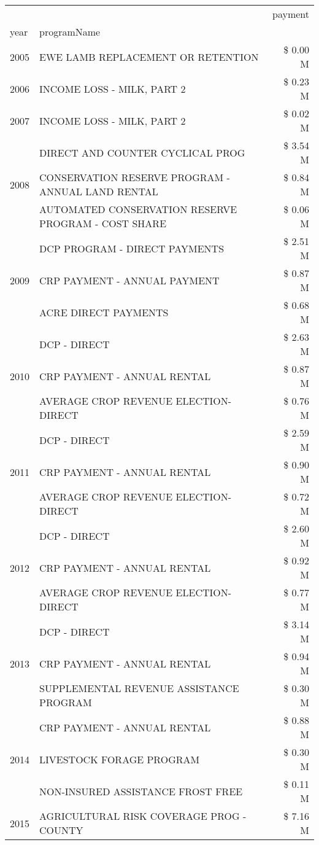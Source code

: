 \begin{tabular}{llr}
\toprule
 &  & payment \\
year & programName &  \\
\midrule
2005 & EWE LAMB REPLACEMENT OR RETENTION & \$ 0.00 M \\
\cline{1-3}
2006 & INCOME LOSS - MILK, PART 2 & \$ 0.23 M \\
\cline{1-3}
2007 & INCOME LOSS - MILK, PART 2 & \$ 0.02 M \\
\cline{1-3}
\multirow[t]{3}{*}{2008} & DIRECT AND COUNTER CYCLICAL PROG & \$ 3.54 M \\
 & CONSERVATION RESERVE PROGRAM - ANNUAL LAND RENTAL & \$ 0.84 M \\
 & AUTOMATED CONSERVATION RESERVE PROGRAM - COST SHARE & \$ 0.06 M \\
\cline{1-3}
\multirow[t]{3}{*}{2009} & DCP PROGRAM - DIRECT PAYMENTS & \$ 2.51 M \\
 & CRP PAYMENT - ANNUAL PAYMENT & \$ 0.87 M \\
 & ACRE DIRECT PAYMENTS & \$ 0.68 M \\
\cline{1-3}
\multirow[t]{3}{*}{2010} & DCP - DIRECT & \$ 2.63 M \\
 & CRP PAYMENT - ANNUAL RENTAL & \$ 0.87 M \\
 & AVERAGE CROP REVENUE ELECTION-DIRECT & \$ 0.76 M \\
\cline{1-3}
\multirow[t]{3}{*}{2011} & DCP - DIRECT & \$ 2.59 M \\
 & CRP PAYMENT - ANNUAL RENTAL & \$ 0.90 M \\
 & AVERAGE CROP REVENUE ELECTION-DIRECT & \$ 0.72 M \\
\cline{1-3}
\multirow[t]{3}{*}{2012} & DCP - DIRECT & \$ 2.60 M \\
 & CRP PAYMENT - ANNUAL RENTAL & \$ 0.92 M \\
 & AVERAGE CROP REVENUE ELECTION-DIRECT & \$ 0.77 M \\
\cline{1-3}
\multirow[t]{3}{*}{2013} & DCP - DIRECT & \$ 3.14 M \\
 & CRP PAYMENT - ANNUAL RENTAL & \$ 0.94 M \\
 & SUPPLEMENTAL REVENUE ASSISTANCE PROGRAM & \$ 0.30 M \\
\cline{1-3}
\multirow[t]{3}{*}{2014} & CRP PAYMENT - ANNUAL RENTAL & \$ 0.88 M \\
 & LIVESTOCK FORAGE PROGRAM & \$ 0.30 M \\
 & NON-INSURED ASSISTANCE FROST FREE & \$ 0.11 M \\
\cline{1-3}
\multirow[t]{3}{*}{2015} & AGRICULTURAL RISK COVERAGE PROG - COUNTY & \$ 7.16 M \\

\end{tabular}
